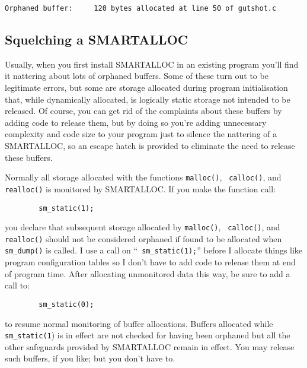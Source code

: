 \footnotesize
\begin{verbatim}
Orphaned buffer:     120 bytes allocated at line 50 of gutshot.c
\end{verbatim}
\normalsize

\subsection{ Squelching a SMARTALLOC}

Usually, when you first install SMARTALLOC in an existing program you'll find
it nattering about lots of orphaned buffers. Some of these turn out to be
legitimate errors, but some are storage allocated during program
initialisation that, while dynamically allocated, is logically static storage
not intended to be released. Of course, you can get rid of the complaints
about these buffers by adding code to release them, but by doing so you're
adding unnecessary complexity and code size to your program just to silence
the nattering of a SMARTALLOC, so an escape hatch is provided to eliminate the
need to release these buffers. 

Normally all storage allocated with the functions {\tt malloc()}, {\tt
calloc()}, and {\tt realloc()} is monitored by SMARTALLOC. If you make the
function call: 

\footnotesize
\begin{verbatim}
        sm_static(1);
\end{verbatim}
\normalsize

you declare that subsequent storage allocated by {\tt malloc()}, {\tt
calloc()}, and {\tt realloc()} should not be considered orphaned if found to
be allocated when {\tt sm\_dump()} is called. I use a call on ``{\tt
sm\_static(1);}'' before I allocate things like program configuration tables
so I don't have to add code to release them at end of program time. After
allocating unmonitored data this way, be sure to add a call to: 

\footnotesize
\begin{verbatim}
        sm_static(0);
\end{verbatim}
\normalsize

to resume normal monitoring of buffer allocations. Buffers allocated while
{\tt sm\_static(1}) is in effect are not checked for having been orphaned but
all the other safeguards provided by SMARTALLOC remain in effect. You may
release such buffers, if you like; but you don't have to. 

